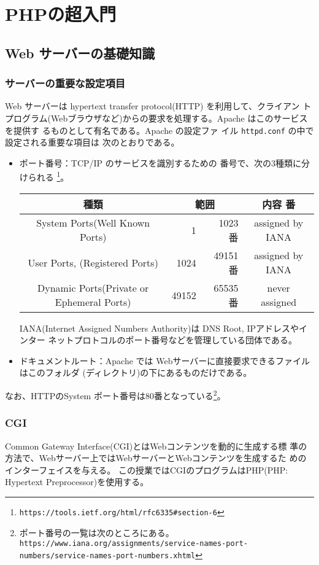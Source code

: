 \chapter{PHPの超入門}
\section{Web サーバーの基礎知識}
\subsection{サーバーの重要な設定項目}
Web サーバーは hypertext transfer protocol(HTTP) を利用して、クライアン
トプログラム(Webブラウザなど)からの要求を処理する。Apache はこのサービスを提供す
るものとして有名である。Apache の設定ファ
イル \texttt{httpd.conf} の中で設定される重要な項目は
次のとおりである。
\begin{itemize}
 \item ポート番号：TCP/IP のサービスを識別するための
       番号で、次の3種類に分けられる
\footnote{\texttt{https://tools.ietf.org/html/rfc6335\#section-6}}。
\begin{center}\vspace{-\baselineskip}
 \begin{tabular}{|c|r@{番$\sim$}r<{番}|c|}
\hline
種類 &\multicolumn{2}{c|}{範囲} &内容 \\\hline
  System Ports(Well Known Ports)& 1&1023 & assigned by IANA\\ \hline
  User Ports, (Registered Ports)& 1024&49151 & assigned by IANA\\
  \hline
  Dynamic Ports(Private or Ephemeral Ports)& 49152& 65535&never assigned \\ \hline
 \end{tabular}
\end{center}
IANA(Internet Assigned Numbers Authority)は DNS Root, IPアドレスやインター
       ネットプロトコルのポート番号などを管理している団体である。


 \item ドキュメントルート：Apache では Webサーバーに直接要求できるファイルはこのフォルダ
       (ディレクトリ)の下にあるものだけである。
\end{itemize}
 なお、HTTPのSystem ポート番号は80番となっている\footnote{ポート番号の一覧は次のところにある。\\
%
 \texttt{https://www.iana.org/assignments/}\texttt{service-names-port-numbers/service-names-port-numbers.xhtml}}。

\subsection{CGI}
Common Gateway Interface(CGI)とはWebコンテンツを動的に生成する標
準の方法で、Webサーバー上ではWebサーバーとWebコンテンツを生成するた
めのインターフェイスを与える。
この授業ではCGIのプログラムはPHP(PHP:
%
Hypertext Preprocessor)を使用する。

